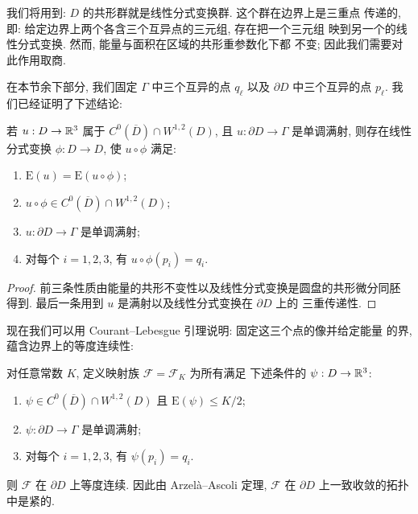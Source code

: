 我们将用到: $D$ 的共形群就是线性分式变换群. 这个群在边界上是三重点
传递的, 即: 给定边界上两个各含三个互异点的三元组, 存在把一个三元组
映到另一个的线性分式变换. 然而, 能量与面积在区域的共形重参数化下都
不变; 因此我们需要对此作用取商.

在本节余下部分, 我们固定 $\Gamma$ 中三个互异的点 $q_\ell$ 以及
$\partial D$ 中三个互异的点 $p_\ell$. 我们已经证明了下述结论:

\begin{lemma}
\label{lem:4.13}
若 $u:D\to\mathbb{R}^3$ 属于 $C^0(\overline{D})\cap W^{1,2}(D)$, 且
$u:\partial D\to\Gamma$ 是单调满射, 则存在线性分式变换 $\phi:D\to D$,
使 $u\circ\phi$ 满足:
\begin{enumerate}
\item $\mathrm{E}(u)=\mathrm{E}(u\circ\phi)$;
\item $u\circ\phi\in C^0(\overline{D})\cap W^{1,2}(D)$;
\item $u:\partial D\to\Gamma$ 是单调满射;
\item 对每个 $i=1,2,3$, 有 $u\circ\phi(p_i)=q_i$.
\end{enumerate}
\end{lemma}

\begin{proof}
前三条性质由能量的共形不变性以及线性分式变换是圆盘的共形微分同胚
得到. 最后一条用到 $u$ 是满射以及线性分式变换在 $\partial D$ 上的
三重传递性.
\end{proof}

现在我们可以用 Courant--Lebesgue 引理说明: 固定这三个点的像并给定能量
的界, 蕴含边界上的等度连续性:

\begin{lemma}
\label{lem:4.14}
对任意常数 $K$, 定义映射族 $\mathcal{F}=\mathcal{F}_K$ 为所有满足
下述条件的 $\psi:D\to\mathbb{R}^3$:
\begin{enumerate}
\item $\psi\in C^0(\overline{D})\cap W^{1,2}(D)$ 且
      $\mathrm{E}(\psi)\leq K/2$;
\item $\psi:\partial D\to\Gamma$ 是单调满射;
\item 对每个 $i=1,2,3$, 有 $\psi(p_i)=q_i$.
\end{enumerate}
则 $\mathcal{F}$ 在 $\partial D$ 上等度连续. 因此由 Arzel\`a--Ascoli
定理, $\mathcal{F}$ 在 $\partial D$ 上一致收敛的拓扑中是紧的.
\end{lemma}

